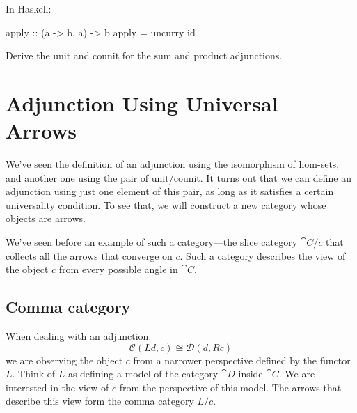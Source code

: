 \documentclass[DaoFP]{subfiles}
\begin{document}
In Haskell:
\begin{haskell}
apply :: (a -> b, a) -> b
apply = uncurry id
\end{haskell}

\begin{exercise}
Derive the unit and counit for the sum and product adjunctions.
\end{exercise}

\section{Adjunction Using Universal Arrows}

We've seen the definition of an adjunction using the isomorphism of hom-sets, and another one using the pair of unit/counit. It turns out that we can define an adjunction using just one element of this pair, as long as it satisfies a certain universality condition. To see that, we will construct a new category whose objects are arrows. 

We've seen before an example of such a category---the slice category $\cat C/ c$ that collects all the arrows that converge on $c$. Such a category describes the view of the object $c$ from every possible angle in $\cat C$. 

\subsection{Comma category}
When dealing with an adjunction:
\[  \mathcal{C} (L d, c) \cong \mathcal{D}( d , R c)\]
we are observing the object $c$ from a narrower perspective defined by the functor $L$. Think of $L$ as defining a model of the category $\cat D$ inside $\cat C$. We are interested in the view of $c$ from the perspective of this model. The arrows that describe this view form the comma category $L/c$.
\end{document}
